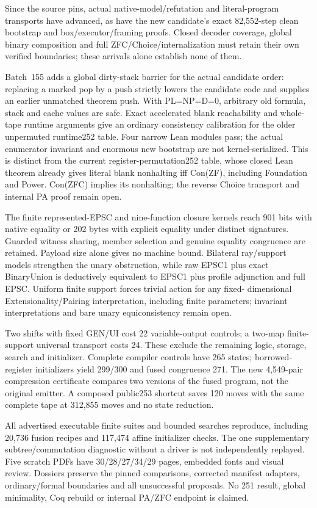 \documentclass[11pt]{article}
\begin{document}
{Since the source pins, actual native-model/refutation and literal-program
transports have advanced, as have the new candidate's exact 82,552-step clean
bootstrap and box/executor/framing proofs. Closed decoder coverage, global binary
composition and full ZFC/Choice/internalization must retain their own verified
boundaries; these arrivals alone establish none of them.

Batch~155 adds a global dirty-stack barrier for the actual candidate order:
replacing a marked pop by a push strictly lowers the candidate code and supplies
an earlier unmatched theorem push. With PL=NP=D=0, arbitrary old formula,
stack and cache values are safe. Exact accelerated blank reachability and
whole-tape runtime arguments give an ordinary consistency calibration for the
older unpermuted runtime252 table. Four narrow Lean modules pass; the actual
enumerator invariant and enormous new bootstrap are not kernel-serialized.
This is distinct from the current register-permutation252 table, whose closed
Lean theorem already gives literal blank nonhalting iff Con(ZF), including
Foundation and Power. Con(ZFC) implies its nonhalting; the reverse Choice
transport and internal PA proof remain open.

The finite represented-EPSC and nine-function closure kernels reach 901 bits
with native equality or 202 bytes with explicit equality under distinct
signatures. Guarded witness sharing, member selection and genuine equality
congruence are retained. Payload size alone gives no machine bound. Bilateral
ray/support models strengthen the unary obstruction, while raw EPSC1 plus
exact BinaryUnion is deductively equivalent to EPSC1 plus profile adjunction
and full EPSC. Uniform finite support forces trivial action for any fixed-
dimensional Extensionality/Pairing interpretation, including finite parameters;
invariant interpretations and bare unary equiconsistency remain open.

Two shifts with fixed GEN/UI cost 22 variable-output controls; a two-map
finite-support universal transport costs 24. These exclude the remaining logic,
storage, search and initializer. Complete compiler controls have 265 states;
borrowed-register initializers yield 299/300 and fused congruence 271. The new
4,549-pair compression certificate compares two versions of the fused program,
not the original emitter. A composed public253 shortcut saves 120 moves with
the same complete tape at 312,855 moves and no state reduction.

All advertised executable finite suites and bounded searches reproduce,
including 20,736 fusion recipes and 117,474 affine initializer checks. The one
supplementary subtree/commutation diagnostic without a driver is not independently
replayed. Five scratch PDFs have 30/28/27/34/29 pages, embedded fonts and visual
review. Dossiers preserve the pinned comparisons, corrected manifest adapters,
ordinary/formal boundaries and all unsuccessful proposals. No 251 result,
global minimality, Coq rebuild or internal PA/ZFC endpoint is claimed.

}
\end{document}
